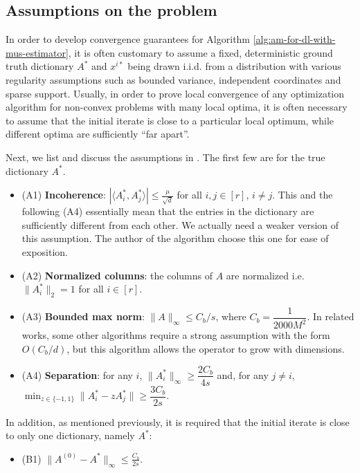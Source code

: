 \subsection{Assumptions on the problem} 

In order to develop convergence guarantees for Algorithm \ref{alg:am-for-dl-with-mus-estimator}, it is often customary to assume a fixed, deterministic ground truth dictionary $A^*$ and $x^{i*}$ being drawn i.i.d. from a distribution with various regularity assumptions such as bounded variance, independent coordinates and sparse support. Usually, in order to prove local convergence of any optimization algorithm for non-convex problems with many local optima, it is often necessary to assume that the initial iterate is close to a particular local optimum, while different optima are sufficiently ``far apart''.

Next, we list and discuss the assumptions in \cite{chatterji2017alternating}. The first few are for the true dictionary $A^*$. 
\begin{itemize}
    \item (A1) \textbf{Incoherence}: $\left| \langle A_i^*, A_j^*\rangle \right| \leq \frac{\mu}{\sqrt{d}} $ for all $i,j\in [r]$, $i\neq j$.  This and the following (A4) essentially mean that the entries in the dictionary are sufficiently different from each other. We actually need a weaker version of this assumption. The author of the algorithm choose this one for ease of exposition.
    \item (A2) \textbf{Normalized columns}: the columns of $A$ are normalized i.e. $\|A_i^*\|_2=1$ for all $i\in [r]$. 
    \item (A3) \textbf{Bounded max norm}: $\|A\|_\infty \leq C_b/s$, where $C_b = \dfrac{1}{2000 M^2}$. In related works, some other algorithms require a strong assumption with the form $O(C_b/d)$, but this algorithm allows the operator to grow with dimensions.
    \item (A4) \textbf{Separation}: for any $i$, $\|A_i^*\|_\infty \geq \dfrac{2C_b}{4s}$ 
    and, for any $j\neq i$, $\min_{z\in \{-1, 1\}} \|A_i^* - z A^*_j\|\geq \dfrac{3C_b}{2s}$.
\end{itemize}

In addition, as mentioned previously, it is required that the initial iterate is close to only one dictionary, namely $A^*$:
\begin{itemize}
    \item (B1) $\|A^{(0)} - A^*\|_\infty \leq \frac{C_b}{2s}$. 
\end{itemize}

